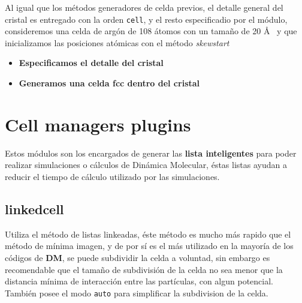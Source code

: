 
Al igual que los m\'etodos generadores de celda previos, el detalle general del
cristal es entregado con la orden \verb|cell|, y el resto especificadio por el
m\'odulo, consideremos una celda de arg\'on de 108 \'atomos con un tama\~no de
20 \AA~ y que inicializamos las posiciones at\'omicas con el m\'etodo
\textit{skewstart}

\begin{itemize}
 \item \textbf{Especificamos el detalle del cristal}
 \item \textbf{Generamos una celda  fcc dentro del cristal}
\end{itemize}
\section{Cell managers plugins}

Estos m\'odulos son los encargados de generar las \textbf{lista inteligentes}
para poder realizar simulaciones o c\'alculos de Din\'amica Molecular, \'estas
listas ayudan a reducir el tiempo de c\'alculo utilizado por las simulaciones.

\subsection{linkedcell}

Utiliza el m\'etodo de listas linkeadas, \'este m\'etodo es mucho m\'as rapido
que el m\'etodo de m\'inima imagen, y de por s\'i es el m\'as utilizado en la
mayor\'ia de los c\'odigos de \textbf{DM}, se puede subdividir la celda a
voluntad, sin embargo es recomendable que el tama\~no de subdivisi\'on de la
celda no sea menor que la distancia m\'inima de interacci\'on entre las
part\'iculas, con algun potencial. Tambi\'en posee el modo \verb|auto| para
simplificar la subdivision de la celda.

